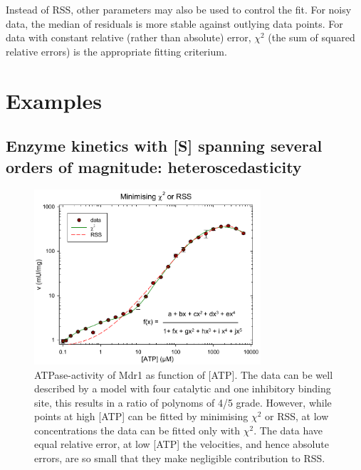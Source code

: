 \begin{refsection}
Instead of \acs{RSS}, other parameters may also be used to control the fit. For noisy data, the median of residuals is more stable against outlying data points. For data with constant relative (rather than absolute) error, \(\chi^2 \) (the sum of squared relative errors) is the appropriate fitting criterium.

\section{Examples}

\subsection{Enzyme kinetics with [S] spanning several orders of magnitude: heteroscedasticity}

\begin{figure}
 \caption{ATPase-activity of Mdr1 as function of [ATP]. The data can be well described by a model with four catalytic and one inhibitory binding site, this results in a ratio of polynoms of 4/5 grade. However, while points at high [ATP] can be fitted by minimising \(\chi^2 \) or RSS, at low concentrations the data can be fitted only with \(\chi^2 \). The data have equal relative error, at low [ATP] the velocities, and hence absolute errors, are so small that they make negligible contribution to \acs{RSS}.}
 \label{fig:ATPase}
 \centering
 \includegraphics[width=0.75\textwidth]{Graphics/ATPase-chisqr-rss}
\end{figure}


\end{refsection}
